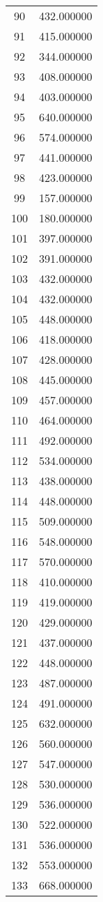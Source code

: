 \documentclass[12pt]{article}
\begin{document}
\begin{longtable}{@{}cc@{}}
90 & 432.000000 \\
91 & 415.000000 \\
92 & 344.000000 \\
93 & 408.000000 \\
94 & 403.000000 \\
95 & 640.000000 \\
96 & 574.000000 \\
97 & 441.000000 \\
98 & 423.000000 \\
99 & 157.000000 \\
100 & 180.000000 \\
101 & 397.000000 \\
102 & 391.000000 \\
103 & 432.000000 \\
104 & 432.000000 \\
105 & 448.000000 \\
106 & 418.000000 \\
107 & 428.000000 \\
108 & 445.000000 \\
109 & 457.000000 \\
110 & 464.000000 \\
111 & 492.000000 \\
112 & 534.000000 \\
113 & 438.000000 \\
114 & 448.000000 \\
115 & 509.000000 \\
116 & 548.000000 \\
117 & 570.000000 \\
118 & 410.000000 \\
119 & 419.000000 \\
120 & 429.000000 \\
121 & 437.000000 \\
122 & 448.000000 \\
123 & 487.000000 \\
124 & 491.000000 \\
125 & 632.000000 \\
126 & 560.000000 \\
127 & 547.000000 \\
128 & 530.000000 \\
129 & 536.000000 \\
130 & 522.000000 \\
131 & 536.000000 \\
132 & 553.000000 \\
133 & 668.000000 \\

\end{longtable}
\end{document}
